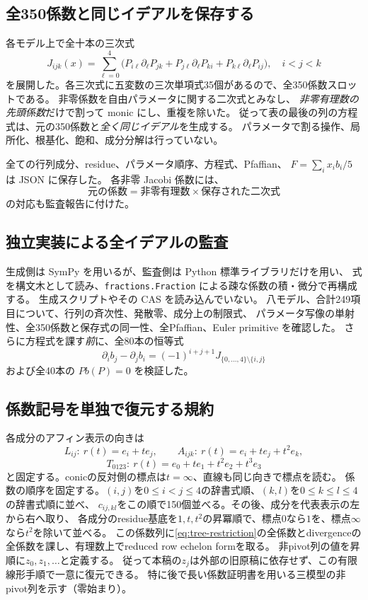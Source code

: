 \documentclass[11pt,a4paper]{ltjsarticle}
\theoremstyle{remark}\newtheorem{remark}[theorem]{注意}
\begin{document}
\subsection{全350係数と同じイデアルを保存する}

各モデル上で全十本の三次式
\[
J_{ijk}(x)=\sum_{\ell=0}^4
\bigl(P_{i\ell}\partial_\ell P_{jk}
+P_{j\ell}\partial_\ell P_{ki}
+P_{k\ell}\partial_\ell P_{ij}\bigr),\quad i<j<k
\]
を展開した。各三次式に五変数の三次単項式35個があるので、全350係数スロットである。
非零係数を自由パラメータに関する二次式とみなし、
\emph{非零有理数の先頭係数}だけで割って monic にし、重複を除いた。
従って表の最後の列の方程式は、元の350係数と\emph{全く同じイデアル}を生成する。
パラメータで割る操作、局所化、根基化、飽和、成分分解は行っていない。

全ての行列成分、residue、パラメータ順序、方程式、Pfaffian、
$F=\sum_i x_i b_i/5$ は JSON に保存した。
各非零 Jacobi 係数には、
\[
\text{元の係数}=\text{非零有理数}\times\text{保存された二次式}
\]
の対応も監査報告に付けた。

\subsection{独立実装による全イデアルの監査}

生成側は SymPy を用いるが、監査側は Python 標準ライブラリだけを用い、
式を構文木として読み、\texttt{fractions.Fraction} による疎な係数の積・微分で再構成する。
生成スクリプトやその CAS を読み込んでいない。
八モデル、合計249項目について、行列の斉次性、発散零、成分上の制限式、
パラメータ写像の単射性、全350係数と保存式の同一性、全Pfaffian、Euler primitive を確認した。
さらに方程式を課す\emph{前}に、全80本の恒等式
\begin{equation}\label{eq:all-dbJ}
\partial_i b_j-\partial_j b_i=(-1)^{i+j+1}J_{\{0,\ldots,4\}\setminus\{i,j\}}
\end{equation}
および全40本の $P b(P)=0$ を検証した。



\subsection{係数記号を単独で復元する規約}
各成分のアフィン表示の向きは
\[
L_{ij}:\ r(t)=e_i+t e_j,\qquad
A_{ijk}:\ r(t)=e_i+t e_j+t^2e_k,
\]
\[
T_{0123}:\ r(t)=e_0+t e_1+t^2e_2+t^3e_3
\]
と固定する。conicの反対側の標点は$t=\infty$、直線も同じ向きで標点を読む。
係数の順序を固定する。$(i,j)$を$0\le i<j\le4$の辞書式順、$(k,l)$を$0\le k\le l\le4$の辞書式順に並べ、
$c_{ij,kl}$をこの順で150個並べる。その後、成分を代表表示の左から右へ取り、
各成分のresidue基底を$1,t,t^2$の昇冪順で、標点$0$なら$1$を、標点$\infty$なら$t^2$を除いて並べる。
この係数列に\eqref{eq:tree-restriction}の全係数とdivergenceの全係数を課し、有理数上でreduced row echelon formを取る。
非pivot列の値を昇順に$z_0,z_1,\ldots$と定義する。
従って本稿の$z_j$は外部の旧原稿に依存せず、この有限線形手順で一意に復元できる。
特に後で長い係数証明書を用いる三模型の非pivot列を示す（零始まり）。
\end{document}
